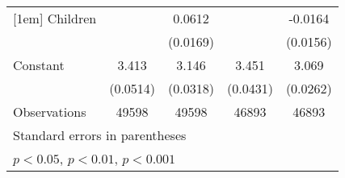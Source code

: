 {\begin{tabular}{l*{4}{c}}
[1em]
Children            &                     &      0.0612\sym{***}&                     &     -0.0164         \\
                    &                     &    (0.0169)         &                     &    (0.0156)         \\
[1em]
Constant            &       3.413\sym{***}&       3.146\sym{***}&       3.451\sym{***}&       3.069\sym{***}\\
                    &    (0.0514)         &    (0.0318)         &    (0.0431)         &    (0.0262)         \\
\hline
Observations        &       49598         &       49598         &       46893         &       46893         \\
\hline\hline
\multicolumn{5}{l}{\footnotesize Standard errors in parentheses}\\
\multicolumn{5}{l}{\footnotesize \sym{*} \(p<0.05\), \sym{**} \(p<0.01\), \sym{***} \(p<0.001\)}\\
\end{tabular}
}
